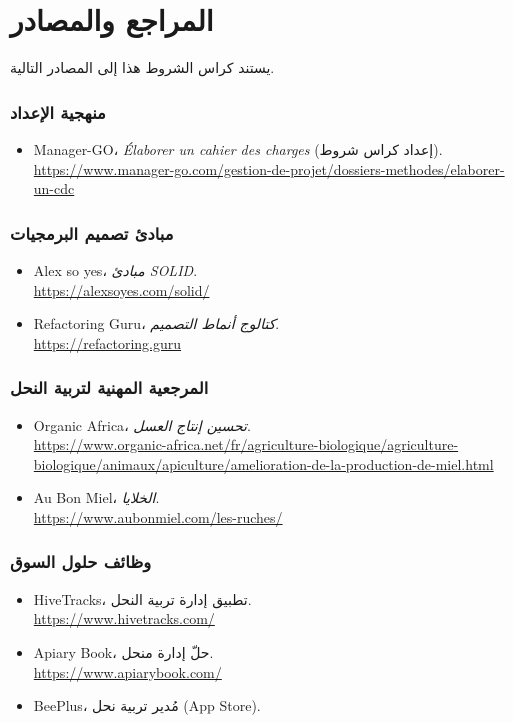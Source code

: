\chapter{المراجع والمصادر}
يستند كراس الشروط هذا إلى المصادر التالية.

\subsection*{منهجية الإعداد}
\begin{itemize}
  \item \textenglish{Manager-GO}، \emph{\textenglish{Élaborer un cahier des charges}} (إعداد كراس شروط).\\ \url{https://www.manager-go.com/gestion-de-projet/dossiers-methodes/elaborer-un-cdc}
\end{itemize}

\subsection*{مبادئ تصميم البرمجيات}
\begin{itemize}
  \item \textenglish{Alex so yes}، \emph{مبادئ SOLID}.\\ \url{https://alexsoyes.com/solid/}
  \item \textenglish{Refactoring Guru}، \emph{كتالوج أنماط التصميم}.\\ \url{https://refactoring.guru}
\end{itemize}

\subsection*{المرجعية المهنية لتربية النحل}
\begin{itemize}
  \item \textenglish{Organic Africa}، \emph{تحسين إنتاج العسل}.\\ \url{https://www.organic-africa.net/fr/agriculture-biologique/agriculture-biologique/animaux/apiculture/amelioration-de-la-production-de-miel.html}
  \item \textenglish{Au Bon Miel}، \emph{الخلايا}.\\ \url{https://www.aubonmiel.com/les-ruches/}
\end{itemize}

\subsection*{وظائف حلول السوق}
\begin{itemize}
  \item \textenglish{HiveTracks}، تطبيق إدارة تربية النحل.\\ \url{https://www.hivetracks.com/}
  \item \textenglish{Apiary Book}، حلّ إدارة منحل.\\ \url{https://www.apiarybook.com/}
  \item \textenglish{BeePlus}، مُدير تربية نحل (App Store).
\end{itemize}

